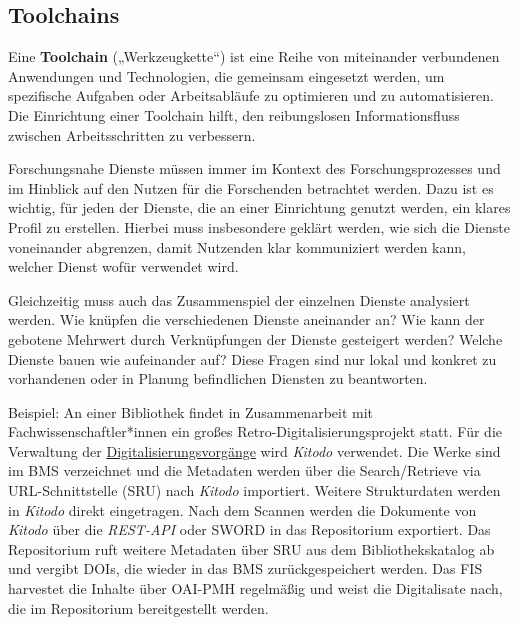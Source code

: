 \documentclass[
  11pt,
  letterpaper,
  DIV=11,
  twoside]{scrreprt}
\begin{document}
\subsection{Toolchains}\label{toolchains}

\begin{tcolorbox}[enhanced jigsaw, leftrule=.75mm, toprule=.15mm, left=2mm, opacityback=0, arc=.35mm, colback=white, breakable, colframe=quarto-callout-important-color-frame, rightrule=.15mm, bottomrule=.15mm]
\begin{minipage}[t]{5.5mm}
\textcolor{quarto-callout-important-color}{\faExclamation}
\end{minipage}%
\begin{minipage}[t]{\textwidth - 5.5mm}

Eine \textbf{Toolchain} („Werkzeugkette``) ist eine Reihe von
miteinander verbundenen Anwendungen und Technologien, die gemeinsam
eingesetzt werden, um spezifische Aufgaben oder Arbeitsabläufe zu
optimieren und zu automatisieren. Die Einrichtung einer Toolchain hilft,
den reibungslosen Informationsfluss zwischen Arbeitsschritten zu
verbessern.

\end{minipage}%
\end{tcolorbox}

Forschungsnahe Dienste müssen immer im Kontext des Forschungsprozesses
und im Hinblick auf den Nutzen für die Forschenden betrachtet werden.
Dazu ist es wichtig, für jeden der Dienste, die an einer Einrichtung
genutzt werden, ein klares Profil zu erstellen. Hierbei muss
insbesondere geklärt werden, wie sich die Dienste voneinander abgrenzen,
damit Nutzenden klar kommuniziert werden kann, welcher Dienst wofür
verwendet wird.

Gleichzeitig muss auch das Zusammenspiel der einzelnen Dienste
analysiert werden. Wie knüpfen die verschiedenen Dienste aneinander an?
Wie kann der gebotene Mehrwert durch Verknüpfungen der Dienste
gesteigert werden? Welche Dienste bauen wie aufeinander auf? Diese
Fragen sind nur lokal und konkret zu vorhandenen oder in Planung
befindlichen Diensten zu beantworten.

Beispiel: An einer Bibliothek findet in Zusammenarbeit mit
Fachwissenschaftler*innen ein großes Retro-Digitalisierungsprojekt
statt. Für die Verwaltung der
\hyperref[digitalisierung]{Digitalisierungsvorgänge} wird \emph{Kitodo}
verwendet. Die Werke sind im BMS verzeichnet und die Metadaten werden
über die Search/Retrieve via URL-Schnittstelle ({SRU}) nach
\emph{Kitodo} importiert. Weitere Strukturdaten werden in \emph{Kitodo}
direkt eingetragen. Nach dem Scannen werden die Dokumente von
\emph{Kitodo} über die \emph{REST-API} oder {SWORD} in das Repositorium
exportiert. Das Repositorium ruft weitere Metadaten über {SRU} aus dem
Bibliothekskatalog ab und vergibt DOIs, die wieder in das BMS
zurückgespeichert werden. Das {FIS} harvestet die Inhalte über {OAI-PMH}
regelmäßig und weist die Digitalisate nach, die im Repositorium
bereitgestellt werden.
\end{document}
